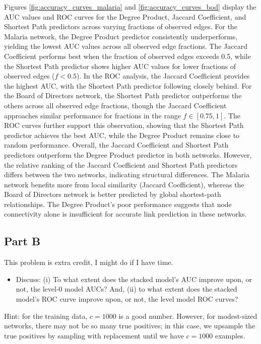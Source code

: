 \documentclass[12pt]{article}
\begin{document}
Figures \ref{fig:accuracy_curves_malaria} and \ref{fig:accuracy_curves_bod} display the AUC values and ROC curves for the Degree Product, Jaccard Coefficient, and Shortest Path predictors across varying fractions of observed edges. For the Malaria network, the Degree Product predictor consistently underperforms, yielding the lowest AUC values across all observed edge fractions. The Jaccard Coefficient performs best when the fraction of observed edges exceeds 0.5, while the Shortest Path predictor shows higher AUC values for lower fractions of observed edges ($f < 0.5$). In the ROC analysis, the Jaccard Coefficient provides the highest AUC, with the Shortest Path predictor following closely behind. For the Board of Directors network, the Shortest Path predictor outperforms the others across all observed edge fractions, though the Jaccard Coefficient approaches similar performance for fractions in the range $f \in [0.75,1]$. The ROC curves further support this observation, showing that the Shortest Path predictor achieves the best AUC, while the Degree Product remains close to random performance. Overall, the Jaccard Coefficient and Shortest Path predictors outperform the Degree Product predictor in both networks. However, the relative ranking of the Jaccard Coefficient and Shortest Path predictors differs between the two networks, indicating structural differences. The Malaria network benefits more from local similarity (Jaccard Coefficient), whereas the Board of Directors network is better predicted by global shortest-path relationships. The Degree Product's poor performance suggests that node connectivity alone is insufficient for accurate link prediction in these networks.

\subsection*{Part B}

This problem is extra credit, I might do if I have time. 

\begin{itemize}
    \item Discuss: (i) To what extent does the stacked model’s AUC improve upon, or not, the level-0 model AUCs? And, (ii) to what extent does the stacked model’s ROC curve improve upon, or not, the level model ROC curves?
\end{itemize}

Hint: for the training data, $c = 1000$ is a good number. However, for modest-sized networks, there may not be so many true positives; in this case, we upsample the true positives by sampling with replacement until we have $c = 1000$ examples.
\end{document}
